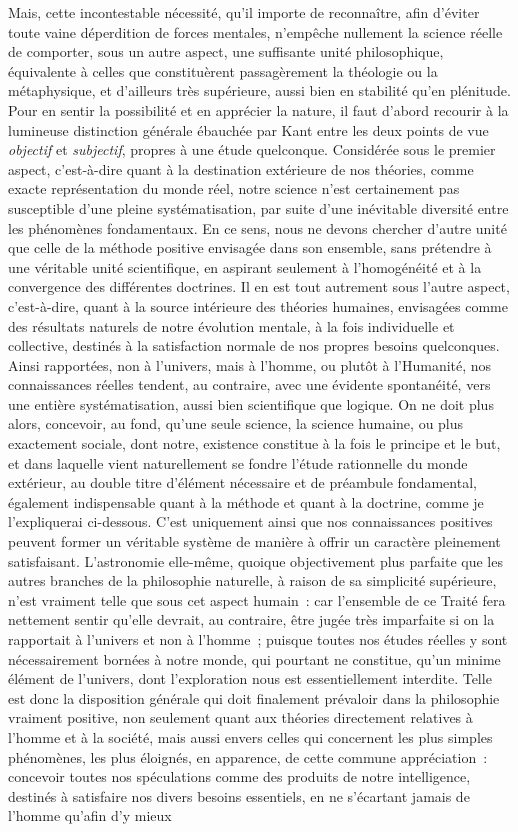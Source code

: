 \documentclass[french,twoside]{book} %
\begin{document}
Mais, cette incontestable nécessité, qu’il importe de reconnaître, afin d’éviter toute vaine déperdition de forces mentales, n’empêche nullement la science réelle de comporter, sous un autre aspect, une suffisante unité philosophique, équivalente à celles que constituèrent passagèrement la théologie ou la métaphysique, et d’ailleurs très supérieure, aussi bien en stabilité qu’en plénitude. Pour en sentir la possibilité et en apprécier la nature, il faut d’abord recourir à la lumineuse distinction générale ébauchée par Kant entre les deux points de vue {\itshape objectif} et {\itshape subjectif}, propres à une étude quelconque. Considérée sous le premier aspect, c’est-à-dire quant à la destination extérieure de nos théories, comme exacte représentation du monde réel, notre science n’est certainement pas susceptible d’une pleine systématisation, par suite d’une inévitable diversité entre les phénomènes fondamentaux. En ce sens, nous ne devons chercher d’autre unité que celle de la méthode positive envisagée dans son ensemble, sans prétendre à une véritable unité scientifique, en aspirant seulement à l’homogénéité et à la convergence des différentes doctrines. Il en est tout autrement sous l’autre aspect, c’est-à-dire, quant à la source intérieure des théories humaines, envisagées comme des résultats naturels de notre évolution mentale, à la fois individuelle et collective, destinés à la satisfaction normale de nos propres besoins quelconques. Ainsi rapportées, non à l’univers, mais à l’homme, ou plutôt à l’Humanité, nos connaissances réelles tendent, au contraire, avec une évidente spontanéité, vers une entière systématisation, aussi bien scientifique que logique. On ne doit plus alors, concevoir, au fond, qu’une seule science, la science humaine, ou plus exactement sociale, dont notre, existence constitue à la fois le principe et le but, et dans laquelle vient naturellement se fondre l’étude rationnelle du monde extérieur, au double titre d’élément nécessaire et de préambule fondamental, également indispensable quant à la méthode et quant à la doctrine, comme je l’expliquerai ci-dessous. C’est uniquement ainsi que nos connaissances positives peuvent former un véritable système de manière à offrir un caractère pleinement satisfaisant. L’astronomie elle-même, quoique objectivement plus parfaite que les autres branches de la philosophie naturelle, à raison de sa simplicité supérieure, n’est vraiment telle que sous cet aspect humain : car l’ensemble de ce Traité fera nettement sentir qu’elle devrait, au contraire, être jugée très imparfaite si on la rapportait à l’univers et non à l’homme ; puisque toutes nos études réelles y sont nécessairement bornées à notre monde, qui pourtant ne constitue, qu’un minime élément de l’univers, dont l’exploration nous est essentiellement interdite. Telle est donc la disposition générale qui doit finalement prévaloir dans la philosophie vraiment positive, non seulement quant aux théories directement relatives à l’homme et à la société, mais aussi envers celles qui concernent les plus simples phénomènes, les plus éloignés, en apparence, de cette commune appréciation : concevoir toutes nos spéculations comme des produits de notre intelligence, destinés à satisfaire nos divers besoins essentiels, en ne s’écartant jamais de l’homme qu’afin d’y mieux 
\end{document}
